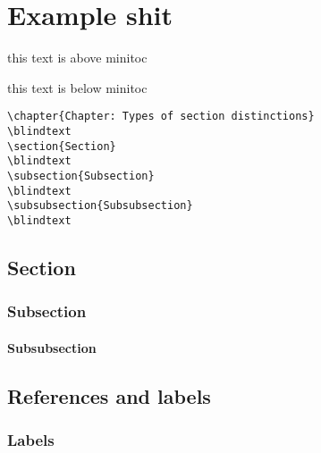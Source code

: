 
\acresetall %


\chapter{Example shit}

this text is above minitoc

this text is below minitoc

\begin{lstlisting}
\chapter{Chapter: Types of section distinctions}
\blindtext
\section{Section} 
\blindtext
\subsection{Subsection}
\blindtext
\subsubsection{Subsubsection}
\blindtext
\end{lstlisting}
\blindtext
\section{Section} 
\blindtext
\subsection{Subsection}
\blindtext
\subsubsection{Subsubsection}
\blindtext



\section{References and labels}



\subsection{Labels}


